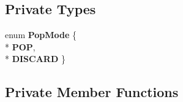 \subsection*{Private Types}
\begin{DoxyCompactItemize}
\item 
enum {\bfseries Pop\+Mode} \{ \\*
{\bfseries P\+OP}, 
\\*
{\bfseries D\+I\+S\+C\+A\+RD}
 \}\hypertarget{classv8_1_1internal_1_1_named_load_handler_compiler_a857bd04df041f349ed871457f4952568}{}\label{classv8_1_1internal_1_1_named_load_handler_compiler_a857bd04df041f349ed871457f4952568}

\end{DoxyCompactItemize}
\subsection*{Private Member Functions}
